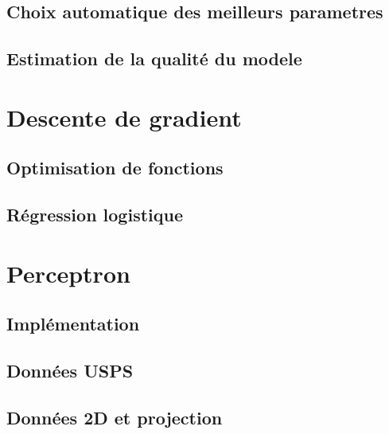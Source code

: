 \documentclass{article}
\begin{document}
\subsection*{Choix automatique des meilleurs parametres}

\subsection*{Estimation de la qualité du modele}

\section{Descente de gradient}

\subsection*{Optimisation de fonctions}

\subsection*{Régression logistique}

\section{Perceptron}

\subsection*{Implémentation}

\subsection*{Données USPS}

\subsection*{Données 2D et projection}
\end{document}
